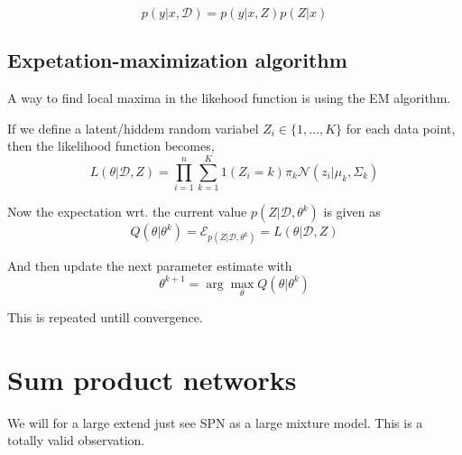 $$p(y|x,\mathcal{D}) = p(y|x,Z)p(Z|x)$$



\subsection*{Expetation-maximization algorithm}
A way to find local maxima in the likehood function is using the EM algorithm. 

If we define a latent/hiddem random variabel $Z_i \in \{1,\dots, K\}$ for each data point, then 
the likelihood function becomes, 
$$L(\theta|\mathcal{D}, Z) = \prod_{i=1}^n \sum_{k=1}^K 1(Z_i = k) \pi_k \mathcal{N}(z_i|\mu_k, \Sigma_k)$$

Now the expectation wrt. the current value $p(Z|\mathcal{D}, \theta^k)$ is given as 
$$Q(\theta|\theta^k) = \mathcal{E}_{p(Z|\mathcal{D}, \theta^k)}=L(\theta|\mathcal{D}, Z) $$

And then update the next parameter estimate with
$$\theta^{k+1} = \arg \max_{\theta} Q(\theta|\theta^k)$$

This is repeated untill convergence. 


\section{Sum product networks}
We will for a large extend just see SPN as a large mixture model. This is a totally valid observation. 


